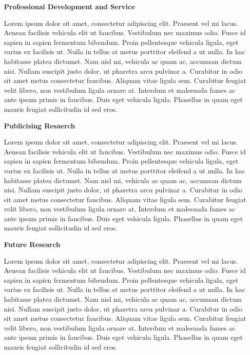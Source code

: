\documentclass[
      12pt,
        ]{article}
\begin{document}
\textbf{Professional Development and Service}

Lorem ipsum dolor sit amet, consectetur adipiscing elit. Praesent vel mi lacus. Aenean facilisis vehicula elit ut faucibus. Vestibulum nec maximus odio. Fusce id sapien in sapien fermentum bibendum. Proin pellentesque vehicula ligula, eget varius ex facilisis ut. Nulla in tellus at metus porttitor eleifend a ut nulla. In hac habitasse platea dictumst. Nam nisl mi, vehicula ac quam ac, accumsan dictum nisi. Nullam suscipit justo dolor, ut pharetra arcu pulvinar a. Curabitur in odio sit amet metus consectetur faucibus. Aliquam vitae ligula sem. Curabitur feugiat velit libero, non vestibulum ligula ornare at. Interdum et malesuada fames ac ante ipsum primis in faucibus. Duis eget vehicula ligula. Phasellus in quam eget mauris feugiat sollicitudin id sed eros.

\textbf{Publicising Resaerch}

Lorem ipsum dolor sit amet, consectetur adipiscing elit. Praesent vel mi lacus. Aenean facilisis vehicula elit ut faucibus. Vestibulum nec maximus odio. Fusce id sapien in sapien fermentum bibendum. Proin pellentesque vehicula ligula, eget varius ex facilisis ut. Nulla in tellus at metus porttitor eleifend a ut nulla. In hac habitasse platea dictumst. Nam nisl mi, vehicula ac quam ac, accumsan dictum nisi. Nullam suscipit justo dolor, ut pharetra arcu pulvinar a. Curabitur in odio sit amet metus consectetur faucibus. Aliquam vitae ligula sem. Curabitur feugiat velit libero, non vestibulum ligula ornare at. Interdum et malesuada fames ac ante ipsum primis in faucibus. Duis eget vehicula ligula. Phasellus in quam eget mauris feugiat sollicitudin id sed eros.

\textbf{Future Research}

Lorem ipsum dolor sit amet, consectetur adipiscing elit. Praesent vel mi lacus. Aenean facilisis vehicula elit ut faucibus. Vestibulum nec maximus odio. Fusce id sapien in sapien fermentum bibendum. Proin pellentesque vehicula ligula, eget varius ex facilisis ut. Nulla in tellus at metus porttitor eleifend a ut nulla. In hac habitasse platea dictumst. Nam nisl mi, vehicula ac quam ac, accumsan dictum nisi. Nullam suscipit justo dolor, ut pharetra arcu pulvinar a. Curabitur in odio sit amet metus consectetur faucibus. Aliquam vitae ligula sem. Curabitur feugiat velit libero, non vestibulum ligula ornare at. Interdum et malesuada fames ac ante ipsum primis in faucibus. Duis eget vehicula ligula. Phasellus in quam eget mauris feugiat sollicitudin id sed eros.
\end{document}
